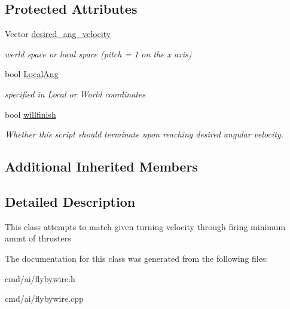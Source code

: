 \subsection*{Protected Attributes}
\begin{DoxyCompactItemize}
\item 
Vector \hyperlink{classOrders_1_1MatchAngularVelocity_a5d02656b4268e37b882e6129a7364d64}{desired\+\_\+ang\+\_\+velocity}\hypertarget{classOrders_1_1MatchAngularVelocity_a5d02656b4268e37b882e6129a7364d64}{}\label{classOrders_1_1MatchAngularVelocity_a5d02656b4268e37b882e6129a7364d64}

\begin{DoxyCompactList}\small\item\em werld space or local space (pitch = 1 on the x axis) \end{DoxyCompactList}\item 
bool \hyperlink{classOrders_1_1MatchAngularVelocity_a129ae09c75a4a253c3b3efcefc3d81e7}{Local\+Ang}\hypertarget{classOrders_1_1MatchAngularVelocity_a129ae09c75a4a253c3b3efcefc3d81e7}{}\label{classOrders_1_1MatchAngularVelocity_a129ae09c75a4a253c3b3efcefc3d81e7}

\begin{DoxyCompactList}\small\item\em specified in Local or World coordinates \end{DoxyCompactList}\item 
bool \hyperlink{classOrders_1_1MatchAngularVelocity_a40c8a1464cbe25a66eaa3a800e85461a}{willfinish}\hypertarget{classOrders_1_1MatchAngularVelocity_a40c8a1464cbe25a66eaa3a800e85461a}{}\label{classOrders_1_1MatchAngularVelocity_a40c8a1464cbe25a66eaa3a800e85461a}

\begin{DoxyCompactList}\small\item\em Whether this script should terminate upon reaching desired angular velocity. \end{DoxyCompactList}\end{DoxyCompactItemize}
\subsection*{Additional Inherited Members}


\subsection{Detailed Description}
This class attempts to match given turning velocity through firing minimum ammt of thrusters 

The documentation for this class was generated from the following files\+:\begin{DoxyCompactItemize}
\item 
cmd/ai/flybywire.\+h\item 
cmd/ai/flybywire.\+cpp\end{DoxyCompactItemize}
